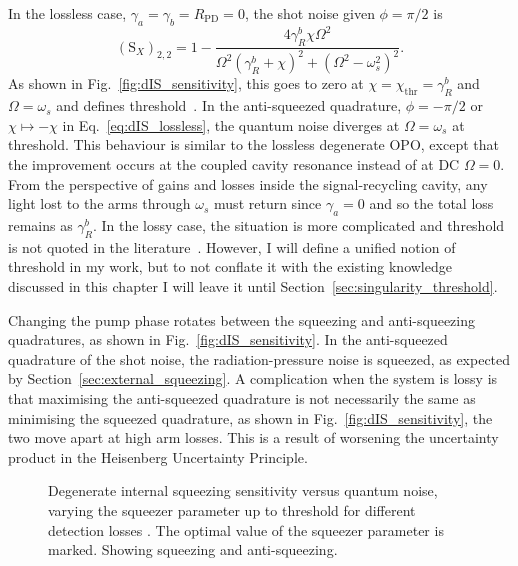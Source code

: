 In the lossless case, $\gamma_a=\gamma_b=R_\text{PD}=0$, the shot noise given $\phi=\pi/2$ is 
\begin{equation}
\label{eq:dIS_lossless}
(\text{S}_X)_{2,2}=1-\frac{4 \gamma^b_R \chi \Omega ^2}{\Omega ^2 (\gamma^b_R+\chi )^2+(\Omega ^2-\omega_s^2)^2}.
\end{equation}
As shown in Fig.~\ref{fig:dIS_sensitivity}, this goes to zero at $\chi=\chi_\text{thr}=\gamma^b_R$ and $\Omega=\omega_s$ and defines threshold~\cite{}. In the anti-squeezed quadrature, $\phi=-\pi/2$ or $\chi\mapsto-\chi$ in Eq.~\ref{eq:dIS_lossless}, the quantum noise diverges at $\Omega=\omega_s$ at threshold. This behaviour is similar to the lossless degenerate OPO, except that the improvement occurs at the coupled cavity resonance instead of at DC $\Omega=0$. From the perspective of gains and losses inside the signal-recycling cavity, any light lost to the arms through $\omega_s$ must return since $\gamma_a=0$ and so the total loss remains as $\gamma^b_R$. In the lossy case, the situation is more complicated and threshold is not quoted in the literature~\cite{}. However, I will define a unified notion of threshold in my work, but to not conflate it with the existing knowledge discussed in this chapter I will leave it until Section~\ref{sec:singularity_threshold}. 

Changing the pump phase rotates between the squeezing and anti-squeezing quadratures, as shown in Fig.~\ref{fig:dIS_sensitivity}. In the anti-squeezed quadrature of the shot noise, the radiation-pressure noise is squeezed, as expected by Section~\ref{sec:external_squeezing}.
A complication when the system is lossy is that maximising the anti-squeezed quadrature is not necessarily the same as minimising the squeezed quadrature, as shown in Fig.~\ref{fig:dIS_sensitivity}, the two move apart at high arm losses. This is a result of worsening the uncertainty product in the Heisenberg Uncertainty Principle. 

\begin{figure}
	\centering
	\caption{Degenerate internal squeezing sensitivity versus quantum noise, varying the squeezer parameter up to threshold for different detection losses . The optimal value of the squeezer parameter is marked. Showing squeezing and anti-squeezing.}
	\label{fig:dIS_optimal_squeezing}
\end{figure}

